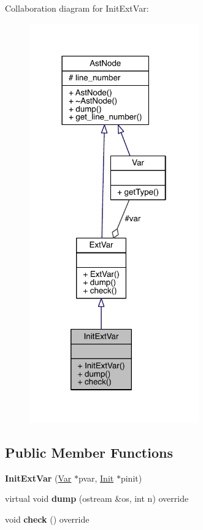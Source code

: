 Collaboration diagram for Init\+Ext\+Var\+:\nopagebreak
\begin{figure}[H]
\begin{center}
\leavevmode
\includegraphics[width=206pt]{class_init_ext_var__coll__graph}
\end{center}
\end{figure}
\subsection*{Public Member Functions}
\begin{DoxyCompactItemize}
\item 
\mbox{\label{class_init_ext_var_ad09db3bbb7b681f7c78d5802fa0b2e04}} 
{\bfseries Init\+Ext\+Var} (\hyperlink{class_var}{Var} $\ast$pvar, \hyperlink{class_init}{Init} $\ast$pinit)
\item 
\mbox{\label{class_init_ext_var_ad4c4e8b8efb98754aead61e70443d518}} 
virtual void {\bfseries dump} (ostream \&os, int n) override
\item 
\mbox{\label{class_init_ext_var_a98f9e53776db14c29260d59a73c8a3be}} 
void {\bfseries check} () override
\end{DoxyCompactItemize}
